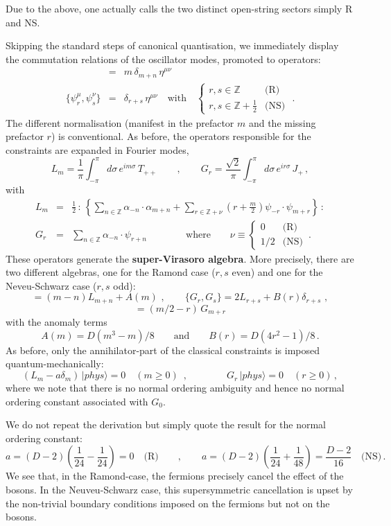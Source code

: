 \documentclass[12pt]{article}
\newcommand{\be}{\begin{equation}}
\newcommand{\ee}{\end{equation}}
\newcommand{\bea}{\begin{eqnarray}}
\newcommand{\eea}{\end{eqnarray}}
\numberwithin{equation}{section}
\begin{document}
Due to the above, one actually calls the two distinct open-string sectors simply R and NS.

Skipping the standard steps of canonical quantisation, we immediately display the commutation relations of the oscillator modes, promoted to operators:
\bea
[\alpha_m^\mu,\alpha_n^\nu] &=& m\,\delta_{m+n}\,\eta^{\mu\nu}
\\
\{\psi_r^\mu,\psi_s^\nu\} &=& \delta_{r+s}\,\eta^{\mu\nu} \quad\mbox{with}\quad
\left\{ \begin{array}{lr}
r,s\in\mathbb{Z} & \mbox{(R)}
\\
r,s\in\mathbb{Z}+\frac{1}{2} & \mbox{(NS)}
\end{array}\right.\,\,.
\nonumber
\eea
The different normalisation (manifest in the prefactor $m$ and the missing prefactor $r$) is conventional. As before, the operators responsible for the constraints are expanded in Fourier modes,
\be
L_m=\frac{1}{\pi}\int_{-\pi}^\pi d\sigma\,e^{im\sigma}\,T_{++}\qquad,\qquad
G_r=\frac{\sqrt{2}}{\pi}\int_{-\pi}^\pi d\sigma\,e^{ir\sigma}\,J_+\,,
\ee
with
\bea
L_m &=& \frac{1}{2}\,:\,\left\{ \sum_{n\in \mathbb{Z}}\alpha_{-n}\cdot \alpha_{m+n} + \sum_{r\in \mathbb{Z}+\nu}\left(r+\frac{m}{2}\right)
\psi_{-r}\cdot\psi_{m+r}\right\}\,:
\\
G_r &=& \sum_{n\in \mathbb{Z}}\alpha_{-n}\cdot\psi_{r+n}\qquad\qquad\mbox{where}\qquad
\nu\equiv\left\{\begin{array}{cc}0 & \mbox{(R)} \\ 1/2 & \mbox{(NS)} \end{array}\,.
\right.
\eea
These operators generate the {\bf super-Virasoro algebra}. More precisely, there are two different algebras, one for the Ramond case ($r,s$ even) and one for the Neveu-Schwarz case ($r,s$ odd):
\be
[L_m,L_n]= (m-n)L_{m+n}+A(m)\,\,,\qquad
\{G_r,G_s\}=2L_{r+s}+B(r)\delta_{r+s}\,\,,
\ee
\be
[L_m,G_r]=(m/2-r)\,G_{m+r}
\ee
with the anomaly terms
\be
A(m)=  D(m^3-m)/8 \qquad\mbox{and}\qquad B(r)=D(4r^2-1)/8\,.
\ee
As before, only the annihilator-part of the classical constraints is imposed quantum-mechanically:
\be
(L_m-a\delta_m)\,|phys\rangle=0\,\,\,\,\,\,(m\ge 0)\,\,\,,\qquad \qquad
G_r\,|phys\rangle=0\,\,\,\,\,\,(r\ge 0)\,,
\ee
where we note that there is no normal ordering ambiguity and hence no normal ordering constant associated with $G_0$. 

We do not repeat the derivation but simply quote the result for the normal ordering constant:
\be
a=(D-2)\left(\frac{1}{24}-\frac{1}{24}\right)=0\,\,\,\,\,\,\mbox{(R)}
\qquad, \qquad
a=(D-2)\left(\frac{1}{24}+\frac{1}{48}\right)=\frac{D-2}{16} \,\,\,\,\,\,\mbox{(NS)}
\,.
\ee
We see that, in the Ramond-case, the fermions precisely cancel the effect of the bosons. In the Neuveu-Schwarz case, this supersymmetric cancellation is upset by the non-trivial boundary conditions imposed on the fermions but not on the bosons.
\end{document}
